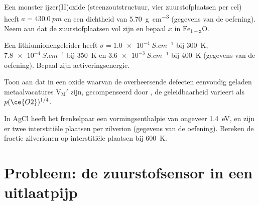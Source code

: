 \begin{exercise}[$\star\star$]\label{exo:b3:solid-state:9}
Een monster ijzer(II)oxide (steenzoutstructuur, vier zuurstofplaatsen per
cel) heeft
$a = \qty{430.0}{pm}$ en een dichtheid van \qty{5.70}{g.cm^{-3}} (gegevens van de oefening). Neem
aan dat de zuurstofplaatsen vol zijn en bepaal $x$ in $\mathrm{Fe_{1-x}O}$.
\end{exercise}

\begin{exercise}[$\star\star\star$]\label{exo:b3:solid-state:10}
Een lithiumionengeleider heeft $\sigma = \qty{1.0e-4}{S.cm^{-1}}$ bij \qty{300}{K}, $\qty{7.8e-4}{S.cm^{-1}}$ bij \qty{350}{K} en
$\qty{3.6e-3}{S.cm^{-1}}$ bij \qty{400}{K} (gegevens van de oefening). Bepaal zijn activeringsenergie.
\end{exercise}

\begin{exercise}[$\star\star\star$]\label{exo:b3:solid-state:11}
Toon aan dat in een oxide waarvan de overheersende defecten eenvoudig
geladen metaalvacatures
$\mathrm{V_M'}$ zijn, gecompenseerd door , de geleidbaarheid varieert als $p(\ce{O2})^{1/4}$.
\end{exercise}

\begin{exercise}[$\star\star\star$]\label{exo:b3:solid-state:12}
In AgCl heeft het frenkelpaar een vormingsenthalpie van ongeveer \qty{1.4}{eV}, en zijn er
twee interstitiële plaatsen per zilverion (gegevens van de oefening).
Bereken de fractie
zilverionen op interstitiële plaatsen bij \qty{600}{K}.
\end{exercise}

\section{Probleem: de zuurstofsensor in een uitlaatpijp}

